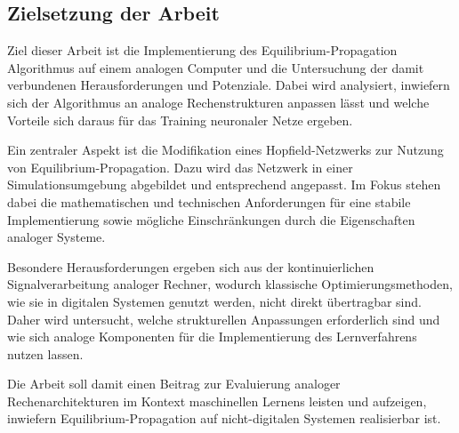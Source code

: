 \subsection{Zielsetzung der Arbeit}

Ziel dieser Arbeit ist die Implementierung des Equilibrium-Propagation Algorithmus auf einem analogen Computer und die Untersuchung der damit verbundenen Herausforderungen und Potenziale. Dabei wird analysiert, inwiefern sich der Algorithmus an analoge Rechenstrukturen anpassen lässt und welche Vorteile sich daraus für das Training neuronaler Netze ergeben.

Ein zentraler Aspekt ist die Modifikation eines Hopfield-Netzwerks zur Nutzung von Equilibrium-Propagation. Dazu wird das Netzwerk in einer Simulationsumgebung abgebildet und entsprechend angepasst. Im Fokus stehen dabei die mathematischen und technischen Anforderungen für eine stabile Implementierung sowie mögliche Einschränkungen durch die Eigenschaften analoger Systeme.

Besondere Herausforderungen ergeben sich aus der kontinuierlichen Signalverarbeitung analoger Rechner, wodurch klassische Optimierungsmethoden, wie sie in digitalen Systemen genutzt werden, nicht direkt übertragbar sind. Daher wird untersucht, welche strukturellen Anpassungen erforderlich sind und wie sich analoge Komponenten für die Implementierung des Lernverfahrens nutzen lassen.

Die Arbeit soll damit einen Beitrag zur Evaluierung analoger Rechenarchitekturen im Kontext maschinellen Lernens leisten und aufzeigen, inwiefern Equilibrium-Propagation auf nicht-digitalen Systemen realisierbar ist.
